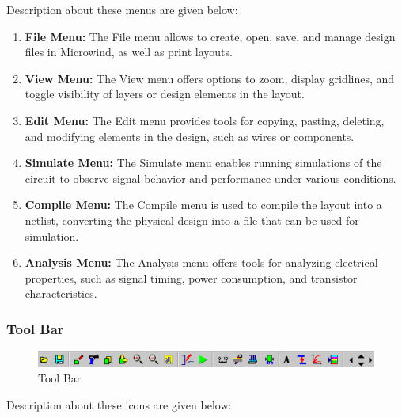 \documentclass[a4paper,12pt]{article}
\begin{document}
	Description about these menus are given below:
	\begin{enumerate}
		
		\item \textbf{File Menu:}
		The File menu allows to create, open, save, and manage design files in Microwind, as well as print layouts.
		\item \textbf{	View Menu:} The View menu offers options to zoom, display gridlines, and toggle visibility of layers or design elements in the layout.
		\item \textbf{Edit Menu:}	 The Edit menu provides tools for copying, pasting, deleting, and modifying elements in the design, such as wires or components.
		\item \textbf{Simulate Menu:}	 The Simulate menu enables running simulations of the circuit to observe signal behavior and performance under various conditions.
		\item \textbf{	Compile Menu:} The Compile menu is used to compile the layout into a netlist, converting the physical design into a file that can be used for simulation.
		\item \textbf{Analysis Menu:}	 The Analysis menu offers tools for analyzing electrical properties, such as signal timing, power consumption, and transistor characteristics.
		
		
	\end{enumerate}
	\newpage
	\subsubsection{Tool Bar}
	\begin{figure}[H]
		\centering
		\includegraphics[width=1\linewidth]{Images/microwind/toolbar}
		\caption{Tool Bar}
		\label{fig:toolbar}
	\end{figure}
	
	Description about these icons are given below:
	
\end{document}

